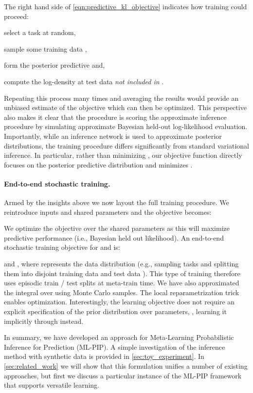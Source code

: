 \documentclass{article}
\begin{document}
The right hand side of \cref{eqn:predictive_kl_objective} indicates how training could proceed: 
\begin{inlinelist}
    \item select a task  at random,
    \item sample some training data ,
    \item form the posterior predictive  and,
    \item compute the log-density  at test data  \emph{not included in} .
\end{inlinelist}   
Repeating this process many times and averaging the results would provide an unbiased estimate of the objective which can then be optimized. This perspective also makes it clear that the procedure is scoring the approximate inference procedure by simulating approximate Bayesian held-out log-likelihood evaluation. Importantly, while an inference network is used to approximate posterior distributions, the training procedure differs significantly from standard variational inference. In particular, rather than minimizing , our objective function directly focuses on the posterior predictive distribution and minimizes .

\paragraph{End-to-end stochastic training.} 
Armed by the insights above we now layout the full training procedure. We reintroduce inputs and shared parameters  and the objective becomes:

We optimize the objective over the shared parameters  as this will maximize predictive performance (i.e., Bayesian held out likelihood). An end-to-end stochastic training objective for  and  is:

and , where  represents the data distribution (e.g., sampling tasks and splitting them into disjoint training data  and test data ). This type of training therefore uses episodic train / test splits at meta-train time.
We have also approximated the integral over  using  Monte Carlo samples. The local reparametrization \citep{kingma2015variational} trick enables optimization. Interestingly, the learning objective does not require an explicit specification of the prior distribution over parameters, , learning it implicitly through  instead. 
 
In summary, we have developed an approach for Meta-Learning Probabilistic Inference for Prediction (ML-PIP). A simple investigation of the inference method with synthetic data is provided in \cref{sec:toy_experiment}. In \cref{sec:related_work} we will show that this formulation unifies a number of existing approaches, but first we discuss a particular instance of the ML-PIP framework that supports versatile learning. 
\end{document}
